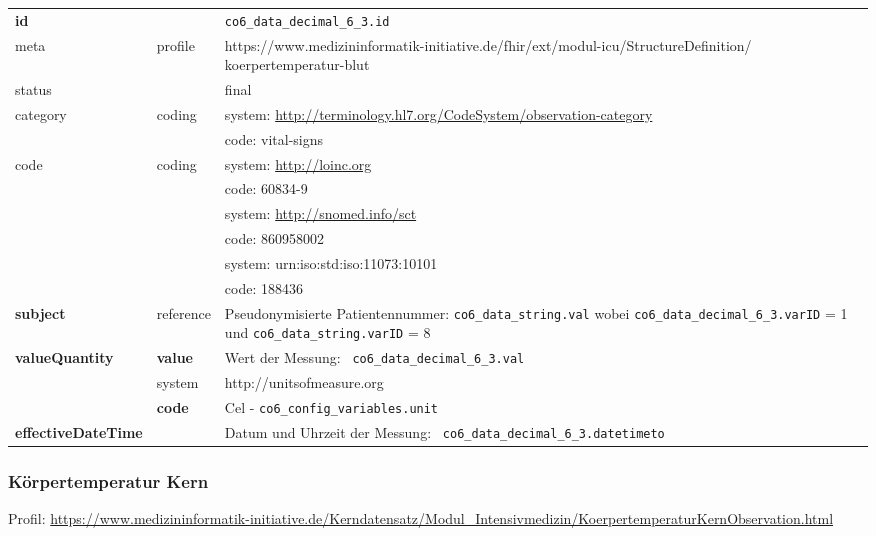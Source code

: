 \begin{longtable}{|l|l|p{7.5cm}|}
        \hline
        \rowcolor{lightgray} \multicolumn{3}{|l|}{Data Mapping (inhaltlich)} \\ \hline
        \textbf{id} &  & \texttt{co6\_data\_decimal\_6\_3.id} \\ \hline
	meta & profile & https://www.medizininformatik-initiative.de/fhir/ext/modul-icu/StructureDefinition/ koerpertemperatur-blut \\ \hline 
	status &  & final   \\ \hline 
	category & coding & system: \url{http://terminology.hl7.org/CodeSystem/observation-category} \\
\cline{3-3}
	& & code: vital-signs \\ \hline
	code & coding & system: \url{http://loinc.org} \\ 
	\cline{3-3} 
	&  & code: 60834-9 \\ 
	\cline{3-3} 
	&  & system: \url{http://snomed.info/sct} \\ 
	\cline{3-3}
	&  & code: 860958002 \\ 
	\cline{3-3} 
	&  & system: urn:iso:std:iso:11073:10101\\ 
	\cline{3-3}
	&  & code: 188436 \\ \hline
	 \textbf{subject} & reference & Pseudonymisierte Patientennummer: \texttt{co6\_data\_string.val} wobei \texttt{co6\_data\_decimal\_6\_3.varID} = 1 und \texttt{co6\_data\_string.varID} = 8 \\ \hline
	 \textbf{valueQuantity}  & \textbf{value} & Wert der Messung: \texttt{
co6\_data\_decimal\_6\_3.val} \\
        \cline{2-3}
         & system & http://unitsofmeasure.org \\
         \cline{2-3}
         & \textbf{code} & Cel - \texttt{co6\_config\_variables.unit} \\ \hline
     \textbf{effectiveDateTime}  & & Datum und Uhrzeit der Messung: \texttt{
co6\_data\_decimal\_6\_3.datetimeto} \\ \hline
\end{longtable}

\subsubsection{Körpertemperatur Kern} 
Profil: \url{https://www.medizininformatik-initiative.de/Kerndatensatz/Modul_Intensivmedizin/KoerpertemperaturKernObservation.html}

